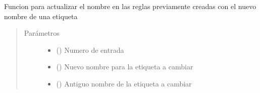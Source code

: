 \documentclass[letterpaper,10pt,spanish]{sphinxmanual}
\begin{document}

\begin{fulllineitems}
\label{\detokenize{codigos/FuzzyHandler:FuzzyHandler.actualizar_RulesEtiquetas_in}}
Funcion para actualizar el nombre en las reglas previamente creadas con el nuevo nombre de una etiqueta
\begin{quote}\begin{description}
\item[{Parámetros}] \leavevmode\begin{itemize}
\item {} 
 () \textendash{} Numero de entrada

\item {} 
 () \textendash{} Nuevo nombre para la etiqueta a cambiar

\item {} 
 () \textendash{} Antiguo nombre de la etiqueta a cambiar

\end{itemize}

\end{description}\end{quote}

\end{fulllineitems}

\end{document}
